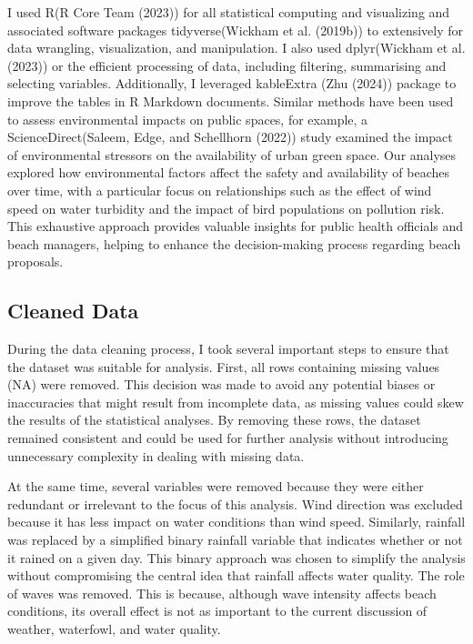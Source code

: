 \documentclass[
  letterpaper,
  DIV=11,
  numbers=noendperiod]{scrartcl}
\begin{document}
I used R(R Core Team (2023)) for all statistical computing and
visualizing and associated software packages tidyverse(Wickham et al.
(2019b)) to extensively for data wrangling, visualization, and
manipulation. I also used dplyr(Wickham et al. (2023)) or the efficient
processing of data, including filtering, summarising and selecting
variables. Additionally, I leveraged kableExtra (Zhu (2024)) package to
improve the tables in R Markdown documents. Similar methods have been
used to assess environmental impacts on public spaces, for example, a
ScienceDirect(Saleem, Edge, and Schellhorn (2022)) study examined the
impact of environmental stressors on the availability of urban green
space. Our analyses explored how environmental factors affect the safety
and availability of beaches over time, with a particular focus on
relationships such as the effect of wind speed on water turbidity and
the impact of bird populations on pollution risk. This exhaustive
approach provides valuable insights for public health officials and
beach managers, helping to enhance the decision-making process regarding
beach proposals.

\subsection{Cleaned Data}\label{sec2-data}

During the data cleaning process, I took several important steps to
ensure that the dataset was suitable for analysis. First, all rows
containing missing values (NA) were removed. This decision was made to
avoid any potential biases or inaccuracies that might result from
incomplete data, as missing values could skew the results of the
statistical analyses. By removing these rows, the dataset remained
consistent and could be used for further analysis without introducing
unnecessary complexity in dealing with missing data.

At the same time, several variables were removed because they were
either redundant or irrelevant to the focus of this analysis. Wind
direction was excluded because it has less impact on water conditions
than wind speed. Similarly, rainfall was replaced by a simplified binary
rainfall variable that indicates whether or not it rained on a given
day. This binary approach was chosen to simplify the analysis without
compromising the central idea that rainfall affects water quality. The
role of waves was removed. This is because, although wave intensity
affects beach conditions, its overall effect is not as important to the
current discussion of weather, waterfowl, and water quality.
\end{document}
